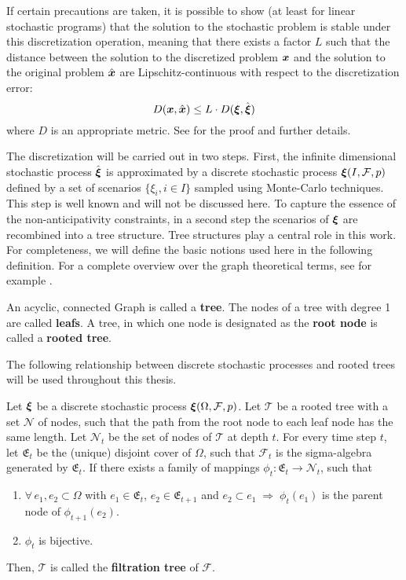 If certain precautions are taken, it is possible to show (at least for linear stochastic programs) that the solution to the stochastic problem is stable under this discretization operation, meaning that there exists a factor $L$ such that the distance between the solution to the discretized problem $\boldsymbol x$ and the solution to the original problem $\hat{\boldsymbol x}$ are Lipschitz-continuous with respect to the discretization error:
\begin{equation}
  D(\boldsymbol x , \hat{\boldsymbol x}) \leq L\cdot D(\boldsymbol\xi,\hat{\boldsymbol\xi})
\end{equation}
where $D$ is an appropriate metric. See \citet{Heitsch2010} for the proof and further details.

The discretization will be carried out in two steps.
First, the infinite dimensional stochastic process $\hat{\boldsymbol\xi}$ is approximated by a discrete stochastic process $\boldsymbol\xi(I,\mathcal{F},p)$ defined by a set of scenarios $\{\xi_i, i\in I\}$  sampled using Monte-Carlo techniques.
This step is well known and will not be discussed here.
To capture the essence of the non-anticipativity constraints, in a second step the scenarios of $\boldsymbol\xi$ are recombined into a tree structure.
Tree structures play a central role in this work.
For completeness, we will define the basic notions used here in the following definition.
For a complete overview over the graph theoretical terms, see for example \citet{Diestel2005}.
\begin{definition}
  \label{def:tree}
  An acyclic, connected Graph is called a \textbf{tree}.
  The nodes of a tree with degree 1 are called \textbf{leafs}.
  A tree, in which one node is designated as the \textbf{root node} is called a \textbf{rooted tree}.
\end{definition}
The following relationship between discrete stochastic processes and rooted trees will be used throughout this thesis.
\begin{definition}
  \label{def:filtration_tree}
  Let $\boldsymbol\xi$ be a discrete stochastic process $\boldsymbol\xi(\Omega, \mathcal{F}, p)$.
  Let $\mathcal{T}$ be a rooted tree with a set $\mathcal{N}$ of nodes, such that the path from the root node to each leaf node has the same length.
  Let $\mathcal{N}_t$ be the set of nodes of $\mathcal{T}$ at depth $t$.
  For every time step $t$, let $\mathfrak{E}_t$ be the (unique) disjoint cover of $\Omega$, such that $\mathcal{F}_t$ is the sigma-algebra generated by $\mathfrak{E}_t$.
  If there exists a family of mappings $\phi_t:\mathfrak{E}_t\rightarrow \mathcal{N}_t$, such that
  \begin{enumerate}
  \item  $\forall\, e_1,e_2\subset \Omega$ with $e_1\in\mathfrak{E}_t$, $e_2\in\mathfrak{E}_{t+1}$ and $e_2\subset e_1\;\Rightarrow\;\phi_t(e_1)$ is the parent node of $\phi_{t+1}(e_2)$.
  \item $\phi_t$ is bijective.
  \end{enumerate}
  Then, $\mathcal{T}$ is called the \textbf{filtration tree} of $\mathcal{F}$.
\end{definition}
